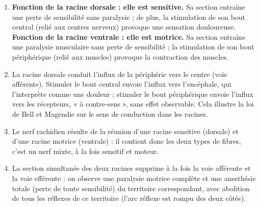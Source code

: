 \documentclass[11pt]{article}
\newcommand{\cle}[1]{{\popxbold\color{popdark}#1}}
\begin{document}
\begin{corrige}
\begin{enumerate}
\item \textbf{Fonction de la racine dorsale : elle est sensitive.} Sa section entraîne une perte de sensibilité sans paralysie ; de plus, la stimulation de son bout central (relié aux centres nerveux) provoque une sensation douloureuse. \textbf{Fonction de la racine ventrale : elle est motrice.} Sa section entraîne une paralysie musculaire sans perte de sensibilité ; la stimulation de son bout périphérique (relié aux muscles) provoque la contraction des muscles.
\item La racine dorsale conduit l'influx \cle{de la périphérie vers le centre} (voie afférente). Stimuler le bout central envoie l'influx vers l'encéphale, qui l'interprète comme une douleur ; stimuler le bout périphérique envoie l'influx vers les récepteurs, « à contre-sens », sans effet observable. Cela illustre la \cle{loi de Bell et Magendie} sur le sens de conduction dans les racines.
\item Le nerf rachidien résulte de la réunion d'une racine sensitive (dorsale) et d'une racine motrice (ventrale) : il contient donc les deux types de fibres, c'est un nerf \cle{mixte}, à la fois sensitif et moteur.
\item La section simultanée des deux racines supprime à la fois la voie afférente et la voie efférente : on observe une \cle{paralysie motrice complète} et une \cle{anesthésie totale} (perte de toute sensibilité) du territoire correspondant, avec abolition de tous les réflexes de ce territoire (l'arc réflexe est rompu des deux côtés).
\end{enumerate}
\end{corrige}
\end{document}
